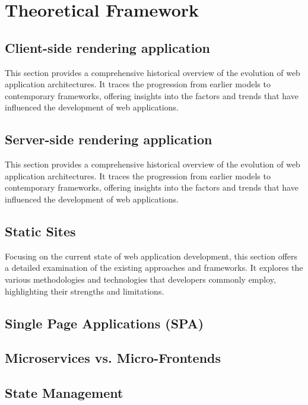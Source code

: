 \chapter{Theoretical Framework}
\label{chap:Theoretical-Framework} 

\section{Client-side rendering application}
This section provides a comprehensive historical overview of the evolution of web application architectures. It traces the progression from earlier models to contemporary frameworks, offering insights into the factors and trends that have influenced the development of web applications.

\section{Server-side rendering application}
This section provides a comprehensive historical overview of the evolution of web application architectures. It traces the progression from earlier models to contemporary frameworks, offering insights into the factors and trends that have influenced the development of web applications.

\section{Static Sites}
Focusing on the current state of web application development, this section offers a detailed examination of the existing approaches and frameworks. It explores the various methodologies and technologies that developers commonly employ, highlighting their strengths and limitations.

\section{Single Page Applications (SPA)}

\section{Microservices vs. Micro-Frontends}

\section{State Management}

